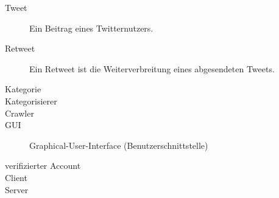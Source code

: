 
\begin{description}
	\item[Tweet] Ein Beitrag eines Twitternutzers.
	\item[Retweet] Ein Retweet ist die Weiterverbreitung eines abgesendeten Tweets.
	\item[Kategorie]
	\item[Kategorisierer]
	\item[Crawler]
	\item[GUI] Graphical-User-Interface (Benutzerschnittstelle)
	\item[verifizierter Account]
	\item[Client]
	\item[Server]
\end{description}
